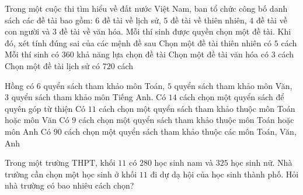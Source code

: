 \begin{ex}%
	Trong một cuộc thi tìm hiểu về đất nước Việt Nam, ban tổ chức công bố danh sách các đề tài bao gồm:  $6$ đề tài về lịch sử, $5$ đề tài về thiên nhiên, $4$ đề tài về con người và $3$ đề tài về văn hóa. Mỗi thí sinh được quyền chọn một đề tài. Khi đó, xét tính đúng sai của các mệnh đề sau
	\choiceTF 
		{\True Chọn  một đề tài thiên nhiên có $5$ cách}
		{Mỗi thí sinh có $360$ khả năng lựa chọn đề  tài}
		{\True Chọn một  đề tài văn hóa có $3$ cách}
		{Chọn  một đề tài lịch sử có $720$ cách}
\end{ex}

\begin{ex}%
	Hồng có $6$ quyển sách tham khảo môn Toán, $5$ quyển sách tham khảo môn  Văn, $3$ quyển sách tham khảo môn Tiếng Anh.
	\choiceTF 
		{\True Có $14$ cách chọn một quyển sách để quyên góp từ  thiện}
		{\True Có $11$ cách chọn một quyển sách tham khảo thuộc môn  Toán hoặc môn Văn}
		{\True Có $9$ cách chọn một quyển sách  tham khảo thuộc môn Toán hoặc môn Anh}
		{Có $90$ cách chọn một quyển sách tham khảo thuộc các môn  Toán, Văn, Anh}
\end{ex}


\begin{bt}%
	Trong một trường THPT, khối $11$ có $280$ học sinh nam và $325$ học sinh nữ. Nhà trường cần chọn một học sinh ở khối $11$ đi dự dạ hội của học sinh thành phố. Hỏi nhà trường có bao  nhiêu cách chọn?
\end{bt}

